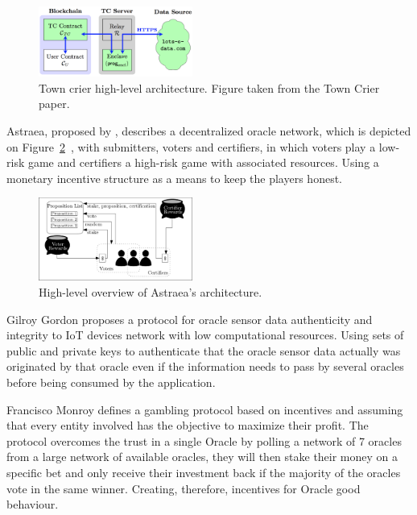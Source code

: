 \documentclass[final,3p,12pt,twocolumn]{elsarticle}
\begin{document}
\begin{figure}[H]
  \begin{center}
    \leavevmode
    \includegraphics[width=0.45\textwidth]{figures/town-crier.png}
    \caption{Town crier high-level architecture. Figure taken from the Town Crier paper.}
    \label{fig:/figures/town-crier}
  \end{center}
\end{figure}


Astraea, proposed by \citet{Adler2018}, describes a decentralized oracle network, which is depicted on Figure~\ref{fig:/figures/astraea}~\cite{Adler2018a}, with submitters, voters and certifiers, in which voters play a low-risk game and certifiers a high-risk game with associated resources. Using a monetary incentive structure as a means to keep the players honest.

\begin{figure}[H]
  \begin{center}
    \leavevmode
    \includegraphics[width=0.45\textwidth]{figures/astraea.jpg}
    \caption{High-level overview of Astraea's architecture.}
    \label{fig:/figures/astraea}
  \end{center}
\end{figure}

Gilroy Gordon \cite{Gordon2017} proposes a protocol for oracle sensor data authenticity and integrity to IoT devices network with low computational resources. Using sets of public and private keys to authenticate that the oracle sensor data actually was originated by that oracle even if the information needs to pass by several oracles before being consumed by the application.

Francisco Monroy \cite{MontotoMonroy2018} defines a gambling protocol based on incentives and assuming that every entity involved has the objective to maximize their profit. The protocol overcomes the trust in a single Oracle by polling a network of 7 oracles from a large network of available oracles, they will then stake their money on a specific bet and only receive their investment back if the majority of the oracles vote in the same winner. Creating, therefore, incentives for Oracle good behaviour.
\end{document}
